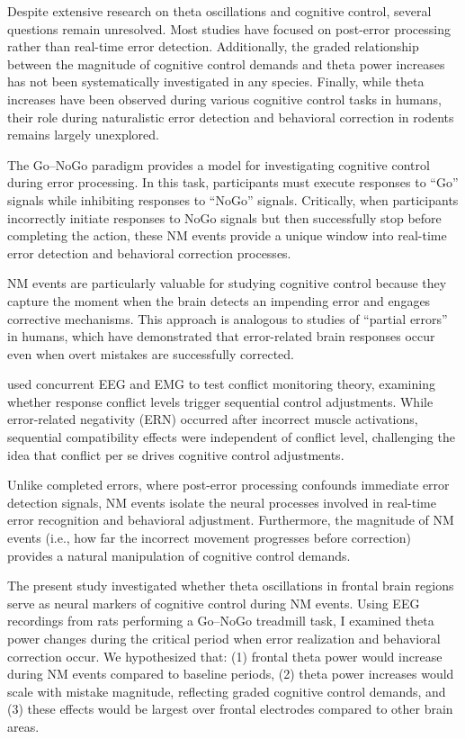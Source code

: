 \documentclass[11pt]{article}
\begin{document}
Despite extensive research on theta oscillations and cognitive control, several questions remain unresolved. Most studies have focused on post-error processing rather than real-time error detection. Additionally, the graded relationship between the magnitude of cognitive control demands and theta power increases has not been systematically investigated in any species. Finally, while theta increases have been observed during various cognitive control tasks in humans, their role during naturalistic error detection and behavioral correction in rodents remains largely unexplored.

The Go–NoGo paradigm provides a model for investigating cognitive control during error processing. In this task, participants must execute responses to ``Go'' signals while inhibiting responses to ``NoGo'' signals. Critically, when participants incorrectly initiate responses to NoGo signals but then successfully stop before completing the action, these NM events provide a unique window into real-time error detection and behavioral correction processes.

NM events are particularly valuable for studying cognitive control because they capture the moment when the brain detects an impending error and engages corrective mechanisms. This approach is analogous to studies of ``partial errors'' in humans, which have demonstrated that error-related brain responses occur even when overt mistakes are successfully corrected.

\citet{burle2005sequential} used concurrent EEG and EMG to test conflict monitoring theory, examining whether response conflict levels trigger sequential control adjustments. While error-related negativity (ERN) occurred after incorrect muscle activations, sequential compatibility effects were independent of conflict level, challenging the idea that conflict per se drives cognitive control adjustments.

Unlike completed errors, where post-error processing confounds immediate error detection signals, NM events isolate the neural processes involved in real-time error recognition and behavioral adjustment. Furthermore, the magnitude of NM events (i.e., how far the incorrect movement progresses before correction) provides a natural manipulation of cognitive control demands.

The present study investigated whether theta oscillations in frontal brain regions serve as neural markers of cognitive control during NM events. Using EEG recordings from rats performing a Go–NoGo treadmill task, I examined theta power changes during the critical period when error realization and behavioral correction occur. We hypothesized that: (1) frontal theta power would increase during NM events compared to baseline periods, (2) theta power increases would scale with mistake magnitude, reflecting graded cognitive control demands, and (3) these effects would be largest over frontal electrodes compared to other brain areas.
\end{document}
